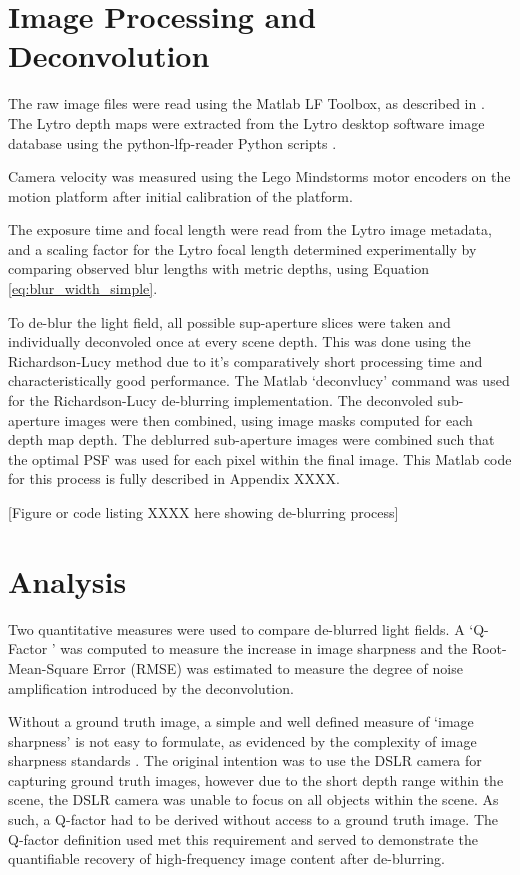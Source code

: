 \section{Image Processing and Deconvolution}
\label{sec:image_processing_and_deconvolution}

The raw image files were read using the Matlab LF Toolbox, as described in \cite{dansereau2013toolbox}.
The Lytro depth maps were extracted from the Lytro desktop software image database using the python-lfp-reader Python scripts \cite{esfahbod2013python}.

Camera velocity was measured using the Lego Mindstorms motor encoders on the motion platform after initial calibration of the platform.

The exposure time and focal length were read from the Lytro image metadata, and a scaling factor for the Lytro focal length determined experimentally by comparing observed blur lengths with metric depths, using Equation \ref{eq:blur_width_simple}.

To de-blur the light field, all possible sup-aperture slices were taken and individually deconvoled once at every scene depth.
This was done using the Richardson-Lucy method due to it's comparatively short processing time and characteristically good performance.
The Matlab \enquote*{deconvlucy} command was used for the Richardson-Lucy de-blurring implementation.
The deconvoled sub-aperture images were then combined, using image masks computed for each depth map depth.
The deblurred sub-aperture images were combined such that the optimal PSF was used for each pixel within the final image.
This Matlab code for this process is fully described in Appendix XXXX.

[Figure or code listing XXXX here showing de-blurring process]

\section{Analysis}
\label{sec:analysis}

Two quantitative measures were used to compare de-blurred light fields.
A \enquote*{Q-Factor	} was computed to measure the increase in image sharpness and the Root-Mean-Square Error (RMSE) was estimated to measure the degree of noise amplification introduced by the deconvolution.

Without a ground truth image, a simple and well defined measure of \enquote*{image sharpness} is not easy to formulate, as evidenced by the complexity of image sharpness standards \cite{imatest2014sharpness}.
The original intention was to use the DSLR camera for capturing ground truth images, however due to the short depth range within the scene, the DSLR camera was unable to focus on all objects within the scene.
As such, a Q-factor had to be derived without access to a ground truth image.
The Q-factor definition used met this requirement and served to demonstrate the quantifiable recovery of high-frequency image content after de-blurring.


